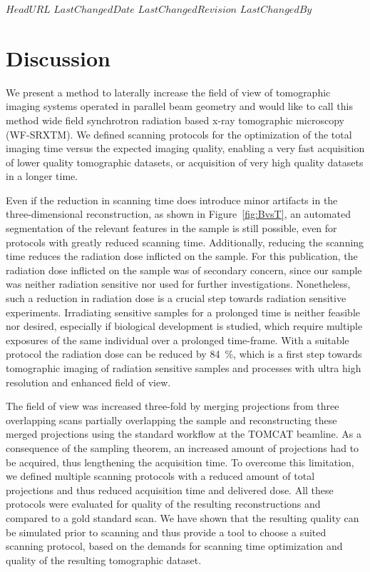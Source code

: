 \svnidlong
{$HeadURL$}
{$LastChangedDate$}
{$LastChangedRevision$}
{$LastChangedBy$}
%
\section{Discussion}\label{sec:Discussion}

We present a method to laterally increase the field of view of tomographic imaging systems operated in parallel beam geometry and would like to call this method wide field synchrotron radiation based x-ray tomographic microscopy (WF-SRXTM). We defined scanning protocols for the optimization of the total imaging time versus the expected imaging quality, enabling a very fast acquisition of lower quality tomographic datasets, or acquisition of very high quality datasets in a longer time.

Even if the reduction in scanning time does introduce minor artifacts in the three-dimensional reconstruction, as shown in Figure~\ref{fig:BvsT}, an automated segmentation of the relevant features in the sample is still possible, even for protocols with greatly reduced scanning time. Additionally, reducing the scanning time reduces the radiation dose inflicted on the sample. For this publication, the radiation dose inflicted on the sample was of secondary concern, since our sample was neither radiation sensitive nor used for further investigations. %
Nonetheless, such a reduction in radiation dose is a crucial step towards radiation sensitive experiments. Irradiating sensitive samples for a prolonged time is neither feasible nor desired, especially if biological development is studied, which require multiple exposures of the same individual over a prolonged time-frame. With a suitable protocol the radiation dose can be reduced by \SI{84}{\percent}, which is a first step towards tomographic imaging of radiation sensitive samples and processes with ultra high resolution and enhanced field of view.

The field of view was increased three-fold by merging projections from three overlapping scans partially overlapping the sample and reconstructing these merged projections using the standard workflow at the TOMCAT beamline. As a consequence of the sampling theorem, an increased amount of projections had to be acquired, thus lengthening the acquisition time. To overcome this limitation, we defined multiple scanning protocols with a reduced amount of total projections and thus reduced acquisition time and delivered dose. All these protocols were evaluated for quality of the resulting reconstructions and compared to a gold standard scan. We have shown that the resulting quality can be simulated prior to scanning and thus provide a tool to choose a suited scanning protocol, based on the demands for scanning time optimization and quality of the resulting tomographic dataset.

